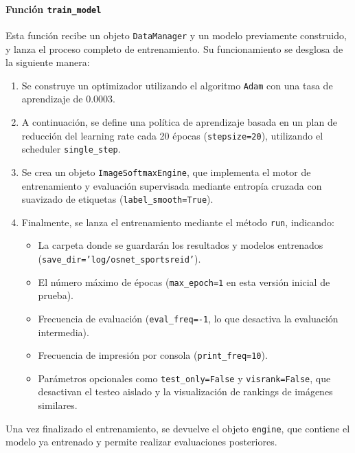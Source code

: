 \documentclass[12pt, a4paper, twoside]{article}
\begin{document}
	\paragraph{Función \texttt{train\_model}}
	
	Esta función recibe un objeto \texttt{DataManager} y un modelo previamente construido, y lanza el proceso completo de entrenamiento. Su funcionamiento se desglosa de la siguiente manera:
	
	\begin{enumerate}
		\item Se construye un optimizador utilizando el algoritmo \texttt{Adam} con una tasa de aprendizaje de 0.0003.
		
		\item A continuación, se define una política de aprendizaje basada en un plan de reducción del learning rate cada 20 épocas (\texttt{stepsize=20}), utilizando el scheduler \texttt{single\_step}.
		
		\item Se crea un objeto \texttt{ImageSoftmaxEngine}, que implementa el motor de entrenamiento y evaluación supervisada mediante entropía cruzada con suavizado de etiquetas (\texttt{label\_smooth=True}).
		
		\item Finalmente, se lanza el entrenamiento mediante el método \texttt{run}, indicando:
		\begin{itemize}
			\item La carpeta donde se guardarán los resultados y modelos entrenados (\texttt{save\_dir='log/osnet\_sportsreid'}).
			\item El número máximo de épocas (\texttt{max\_epoch=1} en esta versión inicial de prueba).
			\item Frecuencia de evaluación (\texttt{eval\_freq=-1}, lo que desactiva la evaluación intermedia).
			\item Frecuencia de impresión por consola (\texttt{print\_freq=10}).
			\item Parámetros opcionales como \texttt{test\_only=False} y \texttt{visrank=False}, que desactivan el testeo aislado y la visualización de rankings de imágenes similares.
		\end{itemize}
	\end{enumerate}
	
	Una vez finalizado el entrenamiento, se devuelve el objeto \texttt{engine}, que contiene el modelo ya entrenado y permite realizar evaluaciones posteriores.
	
\end{document}

